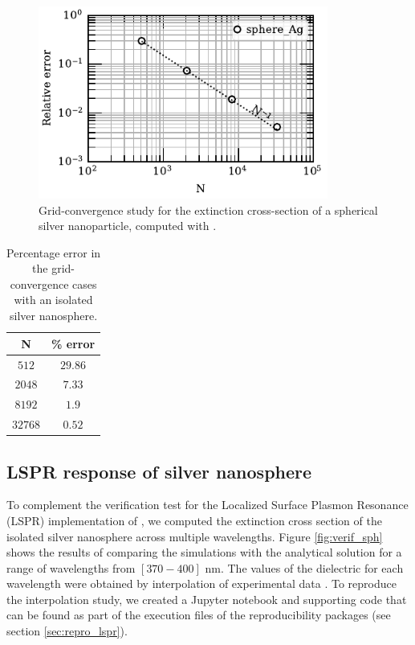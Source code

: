 \begin{figure}%
    \centering
    \includegraphics[width=0.85\textwidth]{convergence_sph_Ag_R8_w380.pdf} 
    \caption{Grid-convergence study for the extinction cross-section of a spherical silver
             nanoparticle, computed with \pygbe.}
    \label{fig:conv_iso_sph}
 \end{figure}
 
 
 \begin{table}%
     \centering
     \caption{\label{table:err_iso_sph} Percentage error in the grid-convergence cases with an 
     isolated silver nanosphere.} 
     \begin{tabular}{c c}
     \hline%
     N & \% error \\
     \hline%
      $512$ & $29.86$ \\
      $2048$ & $7.33$ \\
      $8192$ & $1.9$ \\
      $32768$ & $0.52$ \\
     \hline%
     \end{tabular}
 \end{table}


\subsection{LSPR response of silver nanosphere}\label{sub_sec:lspr_silver_np}

To complement the verification test for the Localized Surface Plasmon Resonance (LSPR) implementation
of \pygbe, we computed the extinction cross section of the isolated silver nanosphere across multiple 
wavelengths. Figure \ref{fig:verif_sph} shows the results of comparing the simulations with the
analytical solution for a range of wavelengths from $[370-400]$ nm. The values of the dielectric 
for each wavelength were obtained by interpolation of experimental data 
\cite{HaleQuerry1972, JohnsonChristy1972}. To reproduce the interpolation study, we created
a Jupyter notebook and supporting code that can be found as part of the execution files of the 
reproducibility packages (see section \ref{sec:repro_lspr}).

